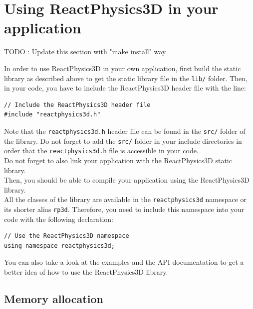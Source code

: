 \documentclass[a4paper,12pt]{article}
\begin{document}
    \section{Using ReactPhysics3D in your application}

    TODO : Update this section with "make install" way

    In order to use ReactPhysics3D in your own application, first build
    the static library as described above to get the
    static library file in the \texttt{lib/} folder. Then, in your code, you have to include
    the ReactPhysics3D header file with the line: \\

    \begin{lstlisting}
// Include the ReactPhysics3D header file
#include "reactphysics3d.h"
  \end{lstlisting}

    \vspace{0.6cm}

    Note that the \texttt{reactphysics3d.h} header file can be found in the
    \texttt{src/} folder of the library. Do not forget to add the
    \texttt{src/} folder in your include directories in order that the
    \texttt{reactphysics3d.h} file is accessible in your code. \\

    Do not forget to also link your application with the ReactPhysics3D
    static library.  \\

    Then, you should be able to compile your application using the
    ReactPhysics3D library. \\

    All the classes of the library are available in the \texttt{reactphysics3d} namespace or its shorter alias
    \texttt{rp3d}. Therefore, you need to include this namespace into your code with the following declaration: \\

    \begin{lstlisting}
// Use the ReactPhysics3D namespace
using namespace reactphysics3d;
    \end{lstlisting}

    \vspace{0.6cm}

    You can also take a look at the examples and the API documentation to get a better idea of how to use the
    ReactPhysics3D library.
   
   \subsection{Memory allocation}
\end{document}
